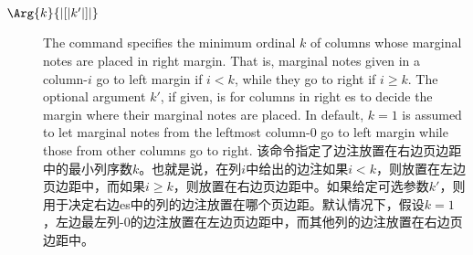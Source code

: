 \begin{description}
\item[\Midx{\!\marginparthreshold!}$\Arg{k}{|[|k'|]|}$]\mbox{}\par
{}
\begin{paracol}{2}
The command specifies the minimum ordinal $k$ of columns whose marginal
notes are placed in right margin.  That is, marginal notes given in a
column-$i$ go to left margin if $i<k$, while they go to right if $i\geq
k$.  The optional argument $k'$, if given, is for columns in right
\parapag{}es to decide the margin where their marginal notes are placed.
In default, $k=1$ is assumed to let marginal notes from the leftmost
column-0 go to left margin while those from other columns go to right.
\switchcolumn
该命令指定了边注放置在右边页边距中的最小列序数$k$。也就是说，在列$i$中给出的边注如果$i<k$，则放置在左边页边距中，而如果$i\geq k$，则放置在右边页边距中。如果给定可选参数$k'$，则用于决定右边\parapag{}es中的列的边注放置在哪个页边距。默认情况下，假设$k=1$，左边最左列-0的边注放置在左边页边距中，而其他列的边注放置在右边页边距中。
\end{paracol}


\end{description}
